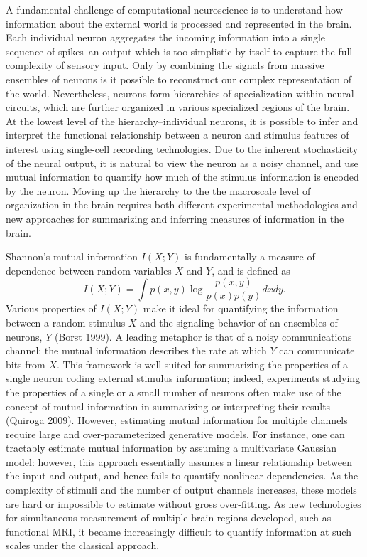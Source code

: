 \documentclass[12pt]{article}
\begin{document}

A fundamental challenge of computational neuroscience is to understand
how information about the external world is processed and represented
in the brain. Each individual neuron aggregates the incoming
information into a single sequence of spikes--an output which is too
simplistic by itself to capture the full complexity of sensory
input. Only by combining the signals from massive ensembles of neurons
is it possible to reconstruct our complex representation of the
world. Nevertheless, neurons form hierarchies of specialization within
neural circuits, which are further organized in various specialized
regions of the brain.  At the lowest level of the hierarchy--individual neurons,
it is possible to infer and interpret the functional relationship between
a neuron and stimulus features of interest using single-cell recording technologies.
Due to the inherent stochasticity of the neural output, it is natural to
view the neuron as a noisy channel, and use mutual information
to quantify how much of the stimulus information is encoded by the neuron.
Moving up the hierarchy to the the macroscale level of organization in the
brain requires both different experimental methodologies and 
new approaches for summarizing and inferring measures of
information in the brain.

Shannon's mutual information $I(X; Y)$ is fundamentally a measure of dependence
between random variables $X$ and $Y$, and is defined as
\[
I(X;Y) = \int p(x, y) \log \frac{p(x, y)}{p(x)p(y)}dxdy.
\]
Various properties of $I(X; Y)$ make it ideal for quantifying the information between
a random stimulus $X$ and the signaling behavior of an ensembles of neurons, $Y$ (Borst 1999).
A leading metaphor is that of a noisy communications channel; the mutual
information describes the rate at which $Y$ can communicate bits from
$X$.  This framework is well-suited for summarizing the properties of
a single neuron coding external stimulus information; indeed,
experiments studying the properties of a single or a small number of
neurons often make use of the concept of mutual information in
summarizing or interpreting their results (Quiroga 2009). However,
estimating mutual information for multiple channels require large and
over-parameterized generative models.  For instance, one can tractably
estimate mutual information by assuming a multivariate Gaussian model:
however, this approach essentially assumes a linear relationship
between the input and output, and hence fails to quantify nonlinear
dependencies.  As the complexity of stimuli and the number of output
channels increases, these models are hard or impossible to estimate
without gross over-fitting.  As new technologies for simultaneous measurement
of multiple brain regions developed, such as functional MRI, it became
increasingly difficult to quantify information at such scales under the classical approach.
 
\end{document}
